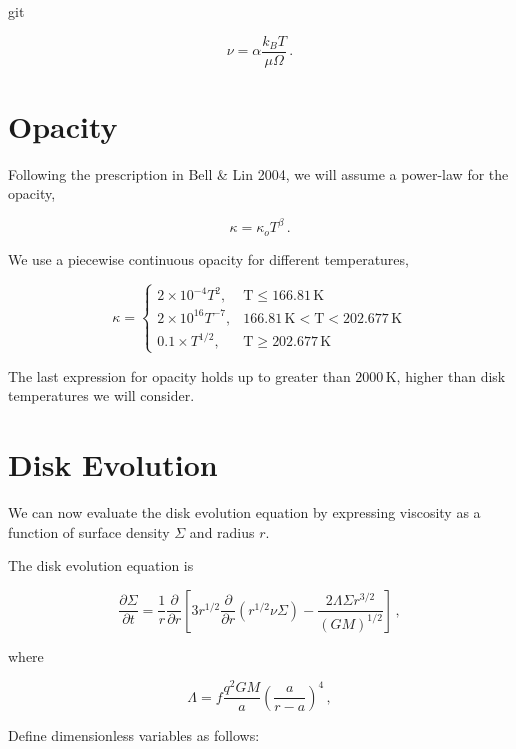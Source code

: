 git\documentclass{article}
\begin{document}
\begin{equation}
\nu = \alpha \frac{k_B T}{\mu \Omega}\,.
\end{equation}

\section{Opacity}

Following the prescription in Bell \& Lin 2004, we will assume a power-law for the opacity,

\begin{equation} \label{eq:op}
\kappa = \kappa_o T^\beta\,.
\end{equation} 

We use a piecewise continuous opacity  for different temperatures,

$$\kappa =
\begin{cases}
2\times 10^{-4} T^2, & \textrm{T} \leq 166.81\, \textrm{K} \\
2\times 10^{16} T^{-7}, & 166.81\, \textrm{K} <  \textrm{T} < 202.677\, \textrm{K} \\
0.1\times T^{1/2}, & \textrm{T} \geq 202.677\, \textrm{K}
\end{cases}
$$

The last expression for opacity holds up to greater than $2000$\,K, higher than disk temperatures we will consider.

\section{Disk Evolution}

We can now evaluate the disk evolution equation by expressing viscosity as a function of surface density $\Sigma$ and radius $r$.

The disk evolution equation is

\begin{equation} \label{eq:diskev}
\frac{\partial \Sigma}{\partial t} = \frac{1}{r} \frac{\partial}{\partial r} \left[3 r^{1/2} \frac{\partial}{\partial r} \left(r^{1/2} \nu \Sigma\right) - \frac{2 \Lambda \Sigma r^{3/2}}{(G M)^{1/2}}\right]\,,
\end{equation}


where 

\begin{equation}
\Lambda = f \frac{q^2 GM}{a} \left(\frac{a}{r-a}\right)^4\,,
\end{equation}

Define dimensionless variables as follows:
\end{document}
